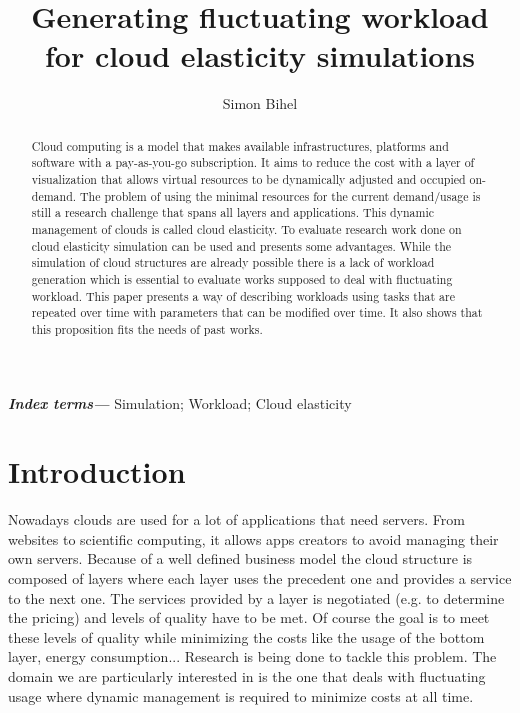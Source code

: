 \documentclass[a4paper, onecolumn]{article}
\title{Generating fluctuating workload for cloud elasticity simulations}
\author{Simon Bihel}
\begin{document}
\maketitle

\begin{abstract}
  Cloud computing is a model that makes available infrastructures, platforms and
  software with a pay-as-you-go subscription. It aims to reduce the cost with a
  layer of visualization that allows virtual resources to be dynamically
  adjusted and occupied on-demand. The problem of using the minimal resources
  for the current demand/usage is still a research challenge that spans all
  layers and applications. This dynamic management of clouds is called cloud
  elasticity. To evaluate research work done on cloud elasticity simulation can 
  be used and presents some advantages. While the simulation of cloud 
  structures are already possible there is a lack of workload generation which 
  is essential to evaluate works supposed to deal with fluctuating workload. 
  This paper presents a way of describing workloads using tasks that are 
  repeated over time with parameters that can be modified over time. It also 
  shows that this proposition fits the needs of past works.
\end{abstract}

\providecommand{\keywords}[1]{\textbf{\textit{Index terms---}} #1}
\keywords{Simulation; Workload; Cloud elasticity}

\section{Introduction} \label{intro}
  Nowadays clouds are used for a lot of applications that need servers. From 
  websites to scientific computing, it allows apps creators to avoid managing 
  their own servers. Because of a well defined business model the cloud 
  structure is composed of layers where each layer uses the precedent one and 
  provides a service to the next one. The services provided by a layer is 
  negotiated (e.g. to determine the pricing) and levels of quality have to be 
  met. Of course the goal is to meet these levels of quality while minimizing 
  the costs like the usage of the bottom layer, energy consumption... Research 
  is being done to tackle this problem. The domain we are particularly 
  interested in is the one that deals with fluctuating usage where dynamic 
  management is required to minimize costs at all time.
  
\end{document}
